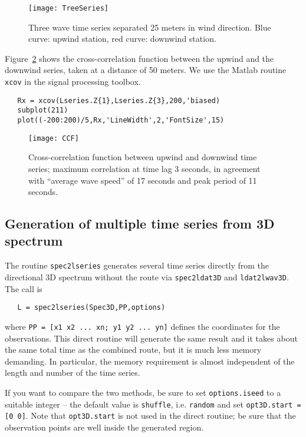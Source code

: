 \begin{figure}[tbh]
\centerline{
\texttt{[image: TreeSeries]}
}
\caption{Three wave time series separated 25 meters in wind direction. Blue curve: upwind station, red curve: downwind station.}
\label{Fig-ThreeSeries}
\end{figure}

Figure~\ref{Fig-CCF} shows the cross-correlation function between the upwind and the downwind series, taken at a distance of 50 meters. We use the {\sc Matlab} routine {\tt xcov} in the signal processing toolbox.
{\small\begin{verbatim}
   Rx = xcov(Lseries.Z{1},Lseries.Z{3},200,'biased)
   subplot(211)
   plot((-200:200)/5,Rx,'LineWidth',2,'FontSize',15)
\end{verbatim}
}

\begin{figure}[tbh]
\centerline{
\texttt{[image: CCF]}
}
\caption{Cross-correlation function between upwind and downwind time series; maximum correlation at time lag 3 seconds, in agreement with ``average wave speed'' of 17 seconds and peak period of 11 seconds.}
\label{Fig-CCF}
\end{figure}

\subsection{Generation of multiple time series from 3D spectrum}
The routine {\tt spec2lseries} generates several time series directly from the directional 3D spectrum without the route via {\tt spec2ldat3D} and {\tt ldat2lwav3D}. The call is
{\small\begin{verbatim}
   L = spec2lseries(Spec3D,PP,options)
\end{verbatim}
}
\noindent
where {\tt PP = [x1 x2 ... xn; y1 y2 ... yn]} defines the coordinates for the observations.  This direct routine will generate the same result and it takes about the same total time as the combined route, but it is much less memory demanding. In particular, the memory requirement is almost independent of the length and number of the time series.  

If you want to compare the two methods, be sure to set {\tt options.iseed} to a suitable integer -- the default value is {\tt shuffle}, i.e. {\tt random} and set {\tt opt3D.start = [0 0]}. Note that  {\tt opt3D.start} is not used in the direct routine; be sure that the observation points are well inside the generated region.

